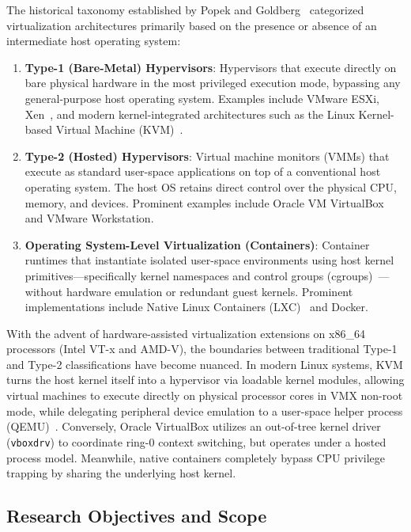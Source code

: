 The historical taxonomy established by Popek and Goldberg~\cite{adams2006comparison} categorized virtualization architectures primarily based on the presence or absence of an intermediate host operating system:
\begin{enumerate}
    \item \textbf{Type-1 (Bare-Metal) Hypervisors}: Hypervisors that execute directly on bare physical hardware in the most privileged execution mode, bypassing any general-purpose host operating system. Examples include VMware ESXi, Xen~\cite{barham2003xen}, and modern kernel-integrated architectures such as the Linux Kernel-based Virtual Machine (KVM)~\cite{kivity2007kvm}.
    \item \textbf{Type-2 (Hosted) Hypervisors}: Virtual machine monitors (VMMs) that execute as standard user-space applications on top of a conventional host operating system. The host OS retains direct control over the physical CPU, memory, and devices. Prominent examples include Oracle VM VirtualBox~\cite{oracle2023vbox} and VMware Workstation.
    \item \textbf{Operating System-Level Virtualization (Containers)}: Container runtimes that instantiate isolated user-space environments using host kernel primitives—specifically kernel namespaces and control groups (cgroups)~\cite{cgroupsv2kernel,kerrisk2010linux}—without hardware emulation or redundant guest kernels. Prominent implementations include Native Linux Containers (LXC)~\cite{lxc2024project} and Docker.
\end{enumerate}

With the advent of hardware-assisted virtualization extensions on x86\_64 processors (Intel VT-x and AMD-V), the boundaries between traditional Type-1 and Type-2 classifications have become nuanced. In modern Linux systems, KVM turns the host kernel itself into a hypervisor via loadable kernel modules, allowing virtual machines to execute directly on physical processor cores in VMX non-root mode, while delegating peripheral device emulation to a user-space helper process (QEMU)~\cite{bellard2005qemu}. Conversely, Oracle VirtualBox utilizes an out-of-tree kernel driver (\texttt{vboxdrv}) to coordinate ring-0 context switching, but operates under a hosted process model. Meanwhile, native containers completely bypass CPU privilege trapping by sharing the underlying host kernel.

\subsection{Research Objectives and Scope}
\label{subsec:research_objectives}

